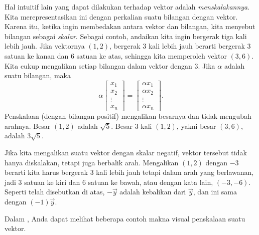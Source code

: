 Hal intuitif lain yang dapat dilakukan terhadap vektor adalah
\emph{menskalakannya}.
Kita merepresentasikan ini dengan perkalian suatu bilangan dengan vektor.
Karena itu, ketika ingin membedakan antara vektor dan bilangan, kita
menyebut bilangan sebagai \emph{skalar}.
Sebagai contoh,
andaikan kita ingin bergerak tiga kali lebih jauh. Jika vektornya $(1,2)$,
bergerak 3 kali lebih jauh berarti bergerak 3 satuan ke kanan dan 6 satuan ke atas,
sehingga kita memperoleh vektor $(3,6)$.
Kita cukup mengalikan setiap bilangan dalam vektor dengan 3.
Jika $\alpha$ adalah suatu bilangan, maka
\begin{equation*}
\alpha
\begin{bmatrix}
x_{1} \\ x_2 \\ \vdots \\ x_n
\end{bmatrix} =
\begin{bmatrix}
\alpha x_{1} \\ \alpha x_2 \\ \vdots \\ \alpha x_n
\end{bmatrix} .
\end{equation*}
Penskalaan (dengan bilangan positif) mengalikan besarnya
dan tidak mengubah arahnya.
Besar $(1,2)$
adalah $\sqrt{5}$. Besar 3 kali $(1,2)$, yakni besar $(3,6)$, adalah
$3\sqrt{5}$.

Jika kita mengalikan suatu vektor dengan skalar negatif,
vektor tersebut tidak hanya diskalakan, tetapi juga berbalik arah.
Mengalikan $(1,2)$ dengan $-3$ berarti kita harus bergerak 3 kali lebih jauh tetapi dalam
arah yang berlawanan, jadi 3 satuan ke kiri dan 6 satuan ke bawah, atau dengan kata
lain, $(-3,-6)$. Seperti telah disebutkan di atas, $-\vec{y}$ adalah kebalikan dari
$\vec{y}$, dan ini sama dengan $(-1)\vec{y}$.

Dalam , Anda dapat melihat beberapa contoh
makna visual penskalaan suatu vektor.

\begin{myfig}
\capstart
{}
\caption{Suatu vektor $\vec{x}$, vektor $2\vec{x}$ (arah sama,
besar dua kali lipat), dan vektor $-1.5\vec{x}$ (arah berlawanan,
besar 1.5 kali lipat).\label{linalg-vecscale:fig}}
\end{myfig}

